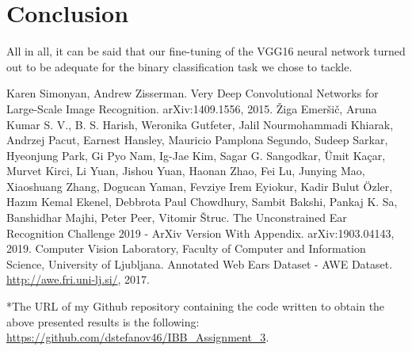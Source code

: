 \documentclass[9pt]{IEEEtran}
\begin{document}
\section{Conclusion}
All in all, it can be said that our fine-tuning of the VGG16 neural network turned out to be adequate for the binary classification task we chose to tackle.


\begin{thebibliography}{99}
 Karen Simonyan, Andrew Zisserman. Very Deep Convolutional Networks for Large-Scale Image Recognition. arXiv:1409.1556, 2015.
 Žiga Emeršič, Aruna Kumar S. V., B. S. Harish, Weronika Gutfeter, Jalil Nourmohammadi Khiarak, Andrzej Pacut, Earnest Hansley, Mauricio Pamplona Segundo, Sudeep Sarkar, Hyeonjung Park, Gi Pyo Nam, Ig-Jae Kim, Sagar G. Sangodkar, Ümit Kaçar, Murvet Kirci, Li Yuan, Jishou Yuan, Haonan Zhao, Fei Lu, Junying Mao, Xiaoshuang Zhang, Dogucan Yaman, Fevziye Irem Eyiokur, Kadir Bulut Özler, Hazım Kemal Ekenel, Debbrota Paul Chowdhury, Sambit Bakshi, Pankaj K. Sa, Banshidhar Majhi, Peter Peer, Vitomir Štruc. The Unconstrained Ear Recognition Challenge 2019 - ArXiv Version With Appendix. arXiv:1903.04143, 2019.
 Computer Vision Laboratory, Faculty of Computer and Information Science, University of Ljubljana. Annotated Web Ears Dataset - AWE Dataset. \url{http://awe.fri.uni-lj.si/}, 2017.
\end{thebibliography}

*The URL of my Github repository containing the code written to obtain the above presented results is the following: \url{https://github.com/dstefanov46/IBB_Assignment_3}.
\end{document}
